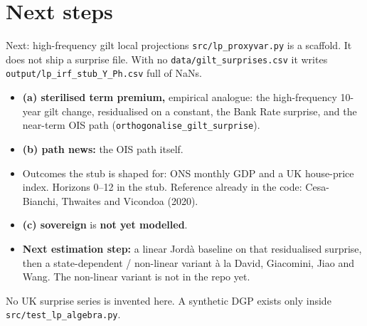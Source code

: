 \documentclass[11pt,aspectratio=169]{beamer}
\begin{document}
\section{Next steps}
\begin{frame}{Next: high-frequency gilt local projections}
  \texttt{src/lp\_proxyvar.py} is a scaffold. It does not ship a surprise file.
  With no \texttt{data/gilt\_surprises.csv} it writes
  \texttt{output/lp\_irf\_stub\_Y\_Ph.csv} full of NaNs.
  \begin{itemize}
    \item \textbf{(a) sterilised term premium,} empirical analogue:
          the high-frequency 10-year gilt change, residualised on a
          constant, the Bank Rate surprise, and the near-term OIS path
          (\texttt{orthogonalise\_gilt\_surprise}).
    \item \textbf{(b) path news:} the OIS path itself.
    \item Outcomes the stub is shaped for: ONS monthly GDP and a UK
          house-price index. Horizons 0--12 in the stub.
          Reference already in the code: Cesa-Bianchi, Thwaites and
          Vicondoa (2020).
    \item \textbf{(c) sovereign} is \textbf{not yet modelled}.
    \item \textbf{Next estimation step:} a linear Jord\`a baseline on
          that residualised surprise, then a state-dependent / non-linear
          variant \`a la David, Giacomini, Jiao and Wang.
          The non-linear variant is not in the repo yet.
  \end{itemize}
  {\scriptsize No UK surprise series is invented here.
  A synthetic DGP exists only inside \texttt{src/test\_lp\_algebra.py}.}
\end{frame}
\end{document}
